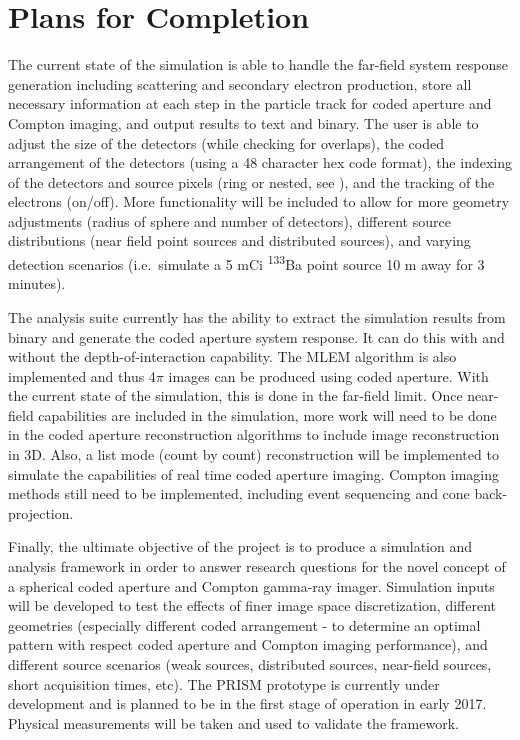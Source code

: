 \documentclass[10pt]{article}
\begin{document}
\section{Plans for Completion}

The current state of the simulation is able to handle the far-field system response generation including scattering and secondary electron production, store all necessary information at each step in the particle track for coded aperture and Compton imaging, and output results to text and binary. The user is able to adjust the size of the detectors (while checking for overlaps), the coded arrangement of the detectors (using a 48 character hex code format), the indexing of the detectors and source pixels (ring or nested, see \cite{Healpix2005}), and the tracking of the electrons (on/off). More functionality will be included to allow for more geometry adjustments (radius of sphere and number of detectors), different source distributions (near field point sources and distributed sources), and varying detection scenarios (i.e.~simulate a 5 mCi \textsuperscript{133}Ba point source 10 m away for 3 minutes).

The analysis suite currently has the ability to extract the simulation results from binary and generate the coded aperture system response. It can do this with and without the depth-of-interaction capability. The MLEM algorithm is also implemented and thus 4$\pi$ images can be produced using coded aperture. With the current state of the simulation, this is done in the far-field limit. Once near-field capabilities are included in the simulation, more work will need to be done in the coded aperture reconstruction algorithms to include image reconstruction in 3D. Also, a list mode (count by count) reconstruction will be implemented to simulate the capabilities of real time coded aperture imaging. Compton imaging methods still need to be implemented, including event sequencing and cone back-projection.

Finally, the ultimate objective of the project is to produce a simulation and analysis framework in order to answer research questions for the novel concept of a spherical coded aperture and Compton gamma-ray imager. Simulation inputs will be developed to test the effects of finer image space discretization, different geometries (especially different coded arrangement - to determine an optimal pattern with respect coded aperture and Compton imaging performance), and different source scenarios (weak sources, distributed sources, near-field sources, short acquisition times, etc). The PRISM prototype is currently under development and is planned to be in the first stage of operation in early 2017. Physical measurements will be taken and used to validate the framework.
\end{document}
